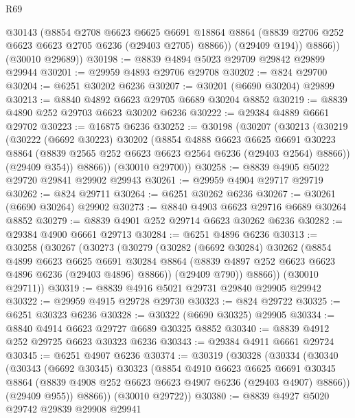 \begin{lexlean}{R69}
\begin{coremodule}
{            @30143
            (@8854
              @2708
              @6623
              @6625
              @6691
              @18864
              @8864
              (@8839 @2706 @252 @6623 @6623 @2705 @6236 (@29403 @2705) @8866))
            (@29409 @194))
          @8866))
      (@30010 @29689))
@30198 := @8839 @4894 @5023 @29709 @29842 @29899 @29944
@30201 := @29959 @4893 @29706 @29708
@30202 := @824 @29700
@30204 := @6251 @30202 @6236
@30207 := @30201 (@6690 @30204) @29899
@30213 := @8840 @4892 @6623 @29705 @6689 @30204 @8852
@30219 := @8839 @4890 @252 @29703 @6623 @30202 @6236
@30222 := @29384 @4889 @6661 @29702
@30223 := @16875 @6236
@30252 := @30198
    (@30207
      (@30213
        (@30219
          (@30222
            (@6692 @30223)
            @30202
            (@8854
              @4888
              @6623
              @6625
              @6691
              @30223
              @8864
              (@8839 @2565 @252 @6623 @6623 @2564 @6236 (@29403 @2564) @8866))
            (@29409 @354))
          @8866))
      (@30010 @29700))
@30258 := @8839 @4905 @5022 @29720 @29841 @29902 @29943
@30261 := @29959 @4904 @29717 @29719
@30262 := @824 @29711
@30264 := @6251 @30262 @6236
@30267 := @30261 (@6690 @30264) @29902
@30273 := @8840 @4903 @6623 @29716 @6689 @30264 @8852
@30279 := @8839 @4901 @252 @29714 @6623 @30262 @6236
@30282 := @29384 @4900 @6661 @29713
@30284 := @6251 @4896 @6236
@30313 := @30258
    (@30267
      (@30273
        (@30279
          (@30282
            (@6692 @30284)
            @30262
            (@8854
              @4899
              @6623
              @6625
              @6691
              @30284
              @8864
              (@8839 @4897 @252 @6623 @6623 @4896 @6236 (@29403 @4896) @8866))
            (@29409 @790))
          @8866))
      (@30010 @29711))
@30319 := @8839 @4916 @5021 @29731 @29840 @29905 @29942
@30322 := @29959 @4915 @29728 @29730
@30323 := @824 @29722
@30325 := @6251 @30323 @6236
@30328 := @30322 (@6690 @30325) @29905
@30334 := @8840 @4914 @6623 @29727 @6689 @30325 @8852
@30340 := @8839 @4912 @252 @29725 @6623 @30323 @6236
@30343 := @29384 @4911 @6661 @29724
@30345 := @6251 @4907 @6236
@30374 := @30319
    (@30328
      (@30334
        (@30340
          (@30343
            (@6692 @30345)
            @30323
            (@8854
              @4910
              @6623
              @6625
              @6691
              @30345
              @8864
              (@8839 @4908 @252 @6623 @6623 @4907 @6236 (@29403 @4907) @8866))
            (@29409 @955))
          @8866))
      (@30010 @29722))
@30380 := @8839 @4927 @5020 @29742 @29839 @29908 @29941
}
\end{coremodule}
\end{lexlean}
